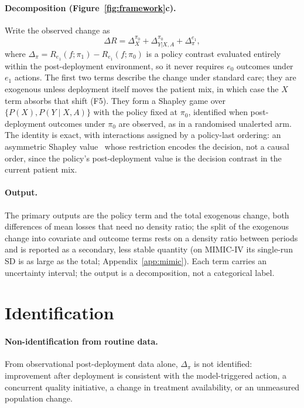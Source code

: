 \documentclass[letterpaper]{article} %
\begin{document}
\paragraph{Decomposition (Figure~\ref{fig:framework}c).} Write the observed change as
\begin{equation}
\Delta R = \Delta_X^{\pi_0} + \Delta_{Y|X,A}^{\pi_0}
          + \Delta_{\pi}^{e_1},
\label{eq:decomp}
\end{equation}
where $\Delta_\pi = R_{e_1}(f; \pi_1) - R_{e_1}(f; \pi_0)$ is a policy contrast
evaluated entirely within the post-deployment environment, so it never requires
$e_0$ outcomes under $e_1$ actions. The first two terms describe the change
under standard care; they are exogenous unless deployment itself moves the
patient mix, in which case the $X$ term absorbs that shift (F5). They form a
Shapley game over $\{P(X), P(Y \mid X, A)\}$ with the policy fixed at $\pi_0$,
identified when post-deployment outcomes under $\pi_0$ are observed, as in a
randomised unalerted arm. The identity is exact, with interactions assigned by
a policy-last ordering: an asymmetric Shapley value~\citep{frye2020asymmetric}
whose restriction encodes the decision, not a causal order, since the policy's
post-deployment value is the decision contrast in the current patient mix.

\paragraph{Output.} The primary outputs are the policy term and the total
exogenous change, both differences of mean losses that need no density ratio;
the split of the exogenous change into covariate and outcome terms rests on a
density ratio between periods and is reported as a secondary, less stable
quantity (on MIMIC-IV its single-run SD is as large as the total;
Appendix~\ref{app:mimic}). Each
term carries an uncertainty interval; the output is a decomposition, not a
categorical label.

\section{Identification}
\label{sec:ident}

\paragraph{Non-identification from routine data.} From observational
post-deployment data alone, $\Delta_\pi$ is not identified: improvement after
deployment is consistent with the model-triggered action, a concurrent quality
initiative, a change in treatment availability, or an unmeasured population
change.
\end{document}
